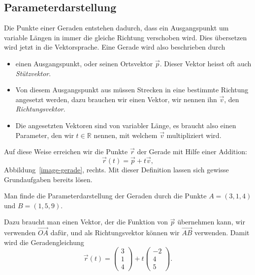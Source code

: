 \subsection{Parameterdarstellung}
Die Punkte einer Geraden entstehen dadurch, dass ein Ausgangspunkt um
variable Längen in immer die gleiche Richtung verschoben wird.
Dies übersetzen wird jetzt in die Vektorsprache.
Eine Gerade wird also beschrieben durch
\begin{itemize}
\item einen Ausgangspunkt, oder seinen Ortsvektor $\vec p$.
Dieser Vektor heisst oft auch {\em Stützvektor}.
\item Von diesem Ausgangspunkt aus müssen Strecken in eine bestimmte
Richtung angesetzt werden, dazu brauchen wir einen Vektor, wir nennen ihn
$\vec v$, den {\em Richtungsvektor}.
\item Die angesetzten Vektoren sind von variabler Länge, es braucht also
einen Parameter, den wir $t\in \mathbb R$ nennen, mit welchem $\vec v$
multipliziert wird.
\end{itemize}
Auf diese Weise erreichen wir die Punkte $\vec r$ der Gerade mit Hilfe
einer Addition:
\[
\vec r(t)=\vec p+t\vec v,
\]
Abbildung~\ref{image-gerade}, rechts.
Mit dieser Definition lassen sich gewisse Grundaufgaben bereits lösen.

\begin{beispiel}
Man finde die Parameterdarstellung der Geraden durch die Punkte
$A=(3,1,4)$ und $B=(1,5,9)$.

\smallskip

{\parindent 0pt
Dazu} braucht man einen Vektor, der die Funktion von $\vec p$ übernehmen
kann, wir verwenden $\overrightarrow{OA}$ dafür, und als
Richtungsvektor können wir $\overrightarrow{AB}$ verwenden.
Damit wird die Geradengleichung
\begin{equation}
\vec r(t) =
\begin{pmatrix}3\\1\\4 \end{pmatrix}
+t
\begin{pmatrix}-2\\4\\5\end{pmatrix}.
\label{pigerade}
\end{equation}
\end{beispiel}


